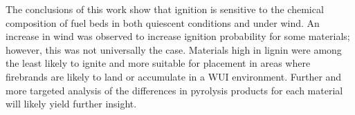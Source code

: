     The conclusions of this work show that ignition is sensitive to the chemical composition of fuel beds in both quiescent conditions and under wind. An increase in wind was observed to increase ignition probability for some materials; however, this was not universally the case. Materials high in lignin were among the least likely to ignite and more suitable for placement in areas where firebrands are likely to land or accumulate in a WUI environment. Further and more targeted analysis of the differences in pyrolysis products for each material will likely yield further insight. 
    

    
   